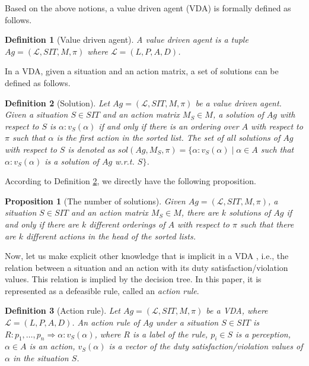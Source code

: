 \documentclass[letterpaper]{article} %
\newtheorem{definition}{Definition}
\newtheorem{proposition}{Proposition}
\begin{document}
Based on the above notions, a value driven agent (VDA) is formally defined as follows.

\begin{definition}[Value driven agent]
A value driven agent is a tuple $Ag = (\mathcal{L}, SIT, M, \pi)$ where $\mathcal{L} = (L, P, A, D)$.  %
\end{definition}

In a VDA, given a situation and an action matrix, a set of solutions can be defined as follows.   

\begin{definition}[Solution] \label{def-solution}
Let $Ag = (\mathcal{L}, SIT, M, \pi)$ be a value driven agent. Given a situation $S\in SIT$ and an action matrix $M_S\in M$, a solution of $Ag$ with respect to $S$ is $\alpha : v_{S}(\alpha)$ if and only if there is an ordering over $A$ with respect to $\pi$ such that $\alpha$ is the first action in the sorted list.  The set of all solutions of $Ag$ with respect to $S$ is denoted as $sol(Ag, M_S, \pi) = \{\alpha : v_{S}(\alpha) \mid \alpha\in A$ such that $\alpha : v_{S}(\alpha)$ is a solution of $Ag$ w.r.t. $S\}$.
\end{definition}

According to Definition \ref{def-solution}, we directly have the following proposition. 

\begin{proposition}[The number of solutions]
Given $Ag = (\mathcal{L}, SIT, M, \pi)$, a situation $S\in SIT$ and an action matrix $M_S\in M$, there are $k$ solutions of $Ag$ if and only if there are $k$ different orderings of $A$ with respect to $\pi$ such that there are $k$ different actions in the head of the sorted lists. 
\end{proposition}

Now, let us make explicit other knowledge that is implicit in a VDA , i.e., the relation between a situation and an action with its duty satisfaction/violation values. This relation is implied by the decision tree. In this paper, it is represented as a defeasible rule, called an \emph{action rule}. 

\begin{definition}[Action rule]\label{def-act-rul}
Let $Ag = (\mathcal{L}, SIT, M, \pi)$ be a VDA, where $\mathcal{L} = (L, P, A, D)$. 
An action rule of $Ag$ under a situation $S\in SIT$ is $R: p_1, \dots, p_n \Rightarrow \alpha: v_S(\alpha)$, where $R$ is a label of the rule, $p_i\in S$ is a perception, $\alpha\in A$ is an action, $v_S(\alpha)$ is a vector of the duty satisfaction/violation values of $\alpha$ in the situation $S$. %
\end{definition}
\end{document}
